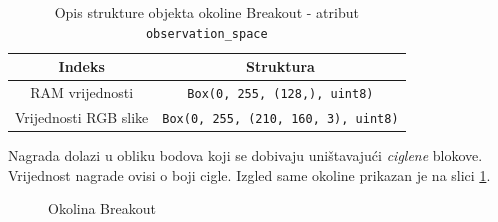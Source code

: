 \begin{table}[H]
    \centering
    \caption{Opis strukture objekta okoline Breakout - atribut \texttt{observation_space}}
    \begin{tabular}{c c}
        \toprule
        Indeks & Struktura  \\
        \midrule
        RAM vrijednosti & \texttt{Box(0, 255, (128,), uint8)}  \\ 
        Vrijednosti RGB slike & \texttt{Box(0, 255, (210, 160, 3), uint8)}  \\
        \bottomrule
    \end{tabular}
    \label{table:breakout-observation}
\end{table}

Nagrada dolazi u obliku bodova koji se dobivaju uništavajući \textit{ciglene} blokove. Vrijednost nagrade ovisi o boji cigle. Izgled same okoline prikazan je na slici \ref{fig:breakout}.

\begin{figure}[H]
    \centering
    \caption{Okolina Breakout}
    \label{fig:breakout}
\end{figure}





